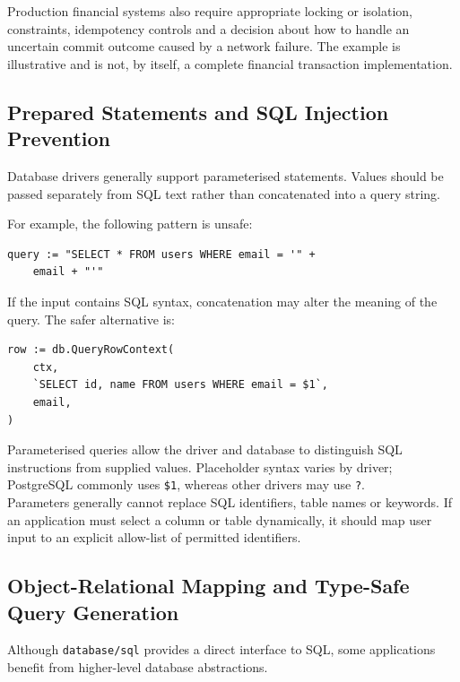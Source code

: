 Production financial systems also require appropriate locking or isolation, constraints, idempotency controls and a decision about how to handle an uncertain commit outcome caused by a network failure. The example is illustrative and is not, by itself, a complete financial transaction implementation.\\

\subsection{Prepared Statements and SQL Injection Prevention}

Database drivers generally support parameterised statements. Values should be passed separately from SQL text rather than concatenated into a query string.

For example, the following pattern is unsafe:

\begin{lstlisting}
query := "SELECT * FROM users WHERE email = '" +
    email + "'"
\end{lstlisting}

If the input contains SQL syntax, concatenation may alter the meaning of the query. The safer alternative is:

\begin{lstlisting}
row := db.QueryRowContext(
    ctx,
    `SELECT id, name FROM users WHERE email = $1`,
    email,
)
\end{lstlisting}

Parameterised queries allow the driver and database to distinguish SQL instructions from supplied values. Placeholder syntax varies by driver; PostgreSQL commonly uses \texttt{\$1}, whereas other drivers may use \texttt{?}.\\

Parameters generally cannot replace SQL identifiers, table names or keywords. If an application must select a column or table dynamically, it should map user input to an explicit allow-list of permitted identifiers.\\

\subsection{Object-Relational Mapping and Type-Safe Query Generation}

Although \texttt{database/sql} provides a direct interface to SQL, some applications benefit from higher-level database abstractions.\\

